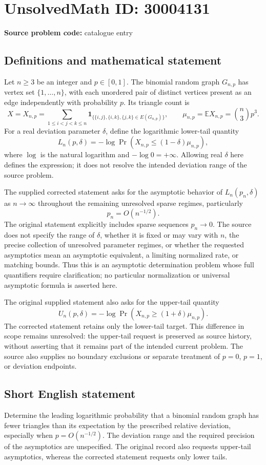 \documentclass[11pt]{article}
\begin{document}
\section*{UnsolvedMath ID: 30004131}
\textbf{Source problem code:} catalogue entry
\subsection{Definitions and mathematical statement}
Let \(n\geq 3\) be an integer and \(p\in[0,1]\). The binomial random graph \(G_{n,p}\) has vertex set \(\{1,\ldots,n\}\), with each unordered pair of distinct vertices present as an edge independently with probability \(p\). Its triangle count is
\[
X=X_{n,p}=\sum_{1\leq i<j<k\leq n}\mathbf{1}_{\{\{i,j\},\{i,k\},\{j,k\}\in E(G_{n,p})\}},
\qquad \mu_{n,p}=\mathbb{E}X_{n,p}=\binom{n}{3}p^3.
\]
For a real deviation parameter \(\delta\), define the logarithmic lower-tail quantity
\[
L_n(p,\delta)=-\log\Pr\!\left(X_{n,p}\leq(1-\delta)\mu_{n,p}\right),
\]
where \(\log\) is the natural logarithm and \(-\log 0=+\infty\). Allowing real \(\delta\) here defines the expression; it does not resolve the intended deviation range of the source problem.

The supplied corrected statement asks for the asymptotic behavior of \(L_n(p_n,\delta)\) as \(n\to\infty\) throughout the remaining unresolved sparse regimes, particularly
\[
p_n=O(n^{-1/2}).
\]
The original statement explicitly includes sparse sequences \(p_n\to0\). The source does not specify the range of \(\delta\), whether it is fixed or may vary with \(n\), the precise collection of unresolved parameter regimes, or whether the requested asymptotics mean an asymptotic equivalent, a limiting normalized rate, or matching bounds. Thus this is an asymptotic determination problem whose full quantifiers require clarification; no particular normalization or universal asymptotic formula is asserted here.

The original supplied statement also asks for the upper-tail quantity
\[
U_n(p,\delta)=-\log\Pr\!\left(X_{n,p}\geq(1+\delta)\mu_{n,p}\right).
\]
The corrected statement retains only the lower-tail target. This difference in scope remains unresolved: the upper-tail request is preserved as source history, without asserting that it remains part of the intended current problem. The source also supplies no boundary exclusions or separate treatment of \(p=0\), \(p=1\), or deviation endpoints.
\subsection{Short English statement}
Determine the leading logarithmic probability that a binomial random graph has fewer triangles than its expectation by the prescribed relative deviation, especially when \(p=O(n^{-1/2})\). The deviation range and the required precision of the asymptotics are unspecified. The original record also requests upper-tail asymptotics, whereas the corrected statement requests only lower tails.
\end{document}

